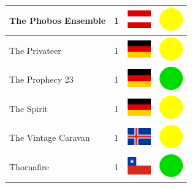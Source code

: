 \documentclass[12pt, a4paper, twoside]{report}
\begin{document}
\begin{center}
\begin{longtable}{|p{5cm}|p{2cm}|p{2cm}|p{2cm}|}
			The Phobos Ensemble & 1 & \includegraphics[width=1cm]{4x3/at} & \includegraphics[width=1cm]{likes/m} \\ \hline
			The Privateer & 1 & \includegraphics[width=1cm]{4x3/de} & \includegraphics[width=1cm]{likes/m} \\ \hline
			The Prophecy 23 & 1 & \includegraphics[width=1cm]{4x3/de} & \includegraphics[width=1cm]{likes/y} \\ \hline
			The Spirit & 1 & \includegraphics[width=1cm]{4x3/de} & \includegraphics[width=1cm]{likes/m} \\ \hline
			The Vintage Caravan & 1 & \includegraphics[width=1cm]{4x3/is} & \includegraphics[width=1cm]{likes/m} \\ \hline
			Thornafire & 1 & \includegraphics[width=1cm]{4x3/cl} & \includegraphics[width=1cm]{likes/y} \\ \hline

\end{longtable}
\end{center}
\end{document}

